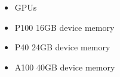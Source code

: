 \documentclass[a4paper,10pt,english]{sphinxmanual}
\begin{document}
\begin{savenotes}
\begin{tabular}[t]{*{4}{}}
\begin{itemize}
\item {} 
 GPUs

\item {} 
\sphinxAtStartPar
P100 16GB device memory

\item {} 
\sphinxAtStartPar
P40 24GB device memory

\item {} 
\sphinxAtStartPar
A100 40GB device memory

\end{itemize}
\\
\sphinxbottomrule
\end{tabular}
\sphinxtableafterendhook\par
\sphinxattableend\end{savenotes}
\end{document}
